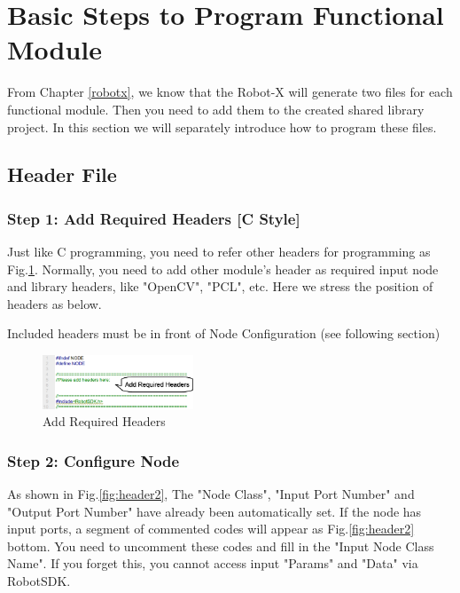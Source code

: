 \documentclass[a4paper,10pt]{book}
\begin{document}
\section{Basic Steps to Program Functional Module}

From Chapter \ref{robotx}, we know that the Robot-X will generate two files for each functional module. Then you need to add them to the created shared library project. In this section we will separately introduce how to program these files.

\subsection{Header File}

\subsubsection{Step 1: Add Required Headers [C Style]}

Just like C programming, you need to refer other headers for programming as Fig.\ref{fig:header1}. Normally, you need to add other module's header as required input node and library headers, like "OpenCV", "PCL", etc. Here we stress the position of headers as below.

\begin{framed}
 Included headers must be in front of Node Configuration (see following section)
\end{framed}

\begin{figure}
 \centering
 \includegraphics[width=0.4\textwidth]{img/header1.eps}
 \caption{Add Required Headers}
 \label{fig:header1}
\end{figure}

\subsubsection{Step 2: Configure Node}

As shown in Fig.\ref{fig:header2}, The "Node Class", "Input Port Number" and "Output Port Number" have already been automatically set. If the node has input ports, a segment of commented codes will appear as Fig.\ref{fig:header2} bottom. You need to uncomment these codes and fill in the "Input Node Class Name". If you forget this, you cannot access input "Params" and "Data" via RobotSDK. 
\end{document}
